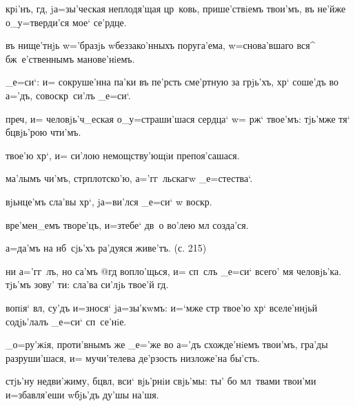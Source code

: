 крi'нъ, гд, jа=зы'ческая неплодя'щая цр~ковь, 
прише'ствiемъ твои'мъ, въ не'йже о_у=тверди'ся мое` 
се'рдце.

въ нище'тнjь w='бразjь w\т беззако'нныхъ поруга'ема, 
w=снова'вшаго вся^ бж~е'ственнымъ манове'нiемъ.

_е=си`: и= сокруше'нна па'ки въ пе'рсть сме'ртную за 
грjь'хъ, хр` соше'дъ во а='дъ, совоскр~си'лъ _е=си`.

преч, и= человjь'ч_еская о_у=страши'шася сердца` w= 
рж` твое'мъ: тjь'мже тя` бц вjь'рою чти'мъ.


твое'ю хр`, и= си'лою немощству'ющiи препоя'сашася.

ма'лымъ чи'мъ, стр плотско'ю, а='гг~льскагw 
_е=стества`.

вjьнце'мъ сла'вы хр`, jа=ви'лся _е=си` w\т 
воскр.


вре'мен_емъ творе'цъ, и=з\ъ тебе` дв~о во'лею мл 
созда'ся.

а=да'мъ на нб~сjь'хъ ра'дуяся живе'тъ. (с. 215)


ни а='гг~лъ, но са'мъ @гд вопло'щься, и= 
сп~слъ _е=си` всего' мя человjь'ка. тjь'мъ зову' ти: 
сла'ва си'лjь твое'й гд.

вопiя` вл, су'дъ и=знося` jа=зы'кwмъ: и=`мже стр 
твое'ю хр` вселе'ннjьй содjь'лалъ _е=си` сп~се'нiе.

_о=ру'жiя, проти'внымъ же _е='же во а='дъ схожде'нiемъ 
твои'мъ, гра'ды разруши'шася, и= мучи'телева де'рзость 
низложе'на бы'сть.

стjь'ну недви'жиму, бц вл, вси` вjь'рнiи свjь'мы: 
ты' бо мл~твами твои'ми и=збавля'еши w\т бjь'дъ ду'шы 
на'шя.

